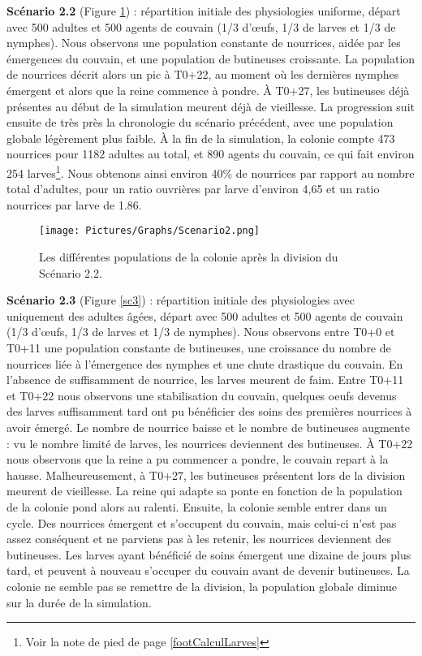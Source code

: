 		\textbf{Scénario 2.2} (Figure \ref{sc2}) : répartition initiale des physiologies uniforme, départ avec 500 adultes et 500 agents de couvain (1/3 d'œufs, 1/3 de larves et 1/3 de nymphes). Nous observons une population constante de nourrices, aidée par les émergences du couvain, et une population de butineuses croissante. La population de nourrices décrit alors un pic à T0+22, au moment où les dernières nymphes émergent et alors que la reine commence à pondre. À T0+27, les butineuses déjà présentes au début de la simulation meurent déjà de vieillesse. La progression suit ensuite de très près la chronologie du scénario précédent, avec une population globale légèrement plus faible. À la fin de la simulation, la colonie compte 473 nourrices pour 1182 adultes au total, et 890 agents du couvain, ce qui fait environ 254 larves\footnote{Voir la note de pied de page \ref{footCalculLarves}}. Nous obtenons ainsi environ 40\% de nourrices par rapport au nombre total d'adultes, pour un ratio ouvrières par larve d'environ 4,65 et un ratio nourrices par larve de 1.86.
	
	\begin{figure}
	\centering
	\texttt{[image: Pictures/Graphs/Scenario2.png]}
	\caption{Les différentes populations de la colonie après la division du Scénario 2.2.}
	\label{sc2}
	\end{figure}
		
		\textbf{Scénario 2.3} (Figure \ref{sc3}) : répartition initiale des physiologies avec uniquement des adultes âgées, départ avec 500 adultes et 500 agents de couvain (1/3 d'œufs, 1/3 de larves et 1/3 de nymphes). Nous observons entre T0+0 et T0+11 une population constante de butineuses, une croissance du nombre de nourrices liée à l'émergence des nymphes et une chute drastique du couvain. En l'absence de suffisamment de nourrice, les larves meurent de faim. Entre T0+11 et T0+22 nous observons une stabilisation du couvain, quelques oeufs devenus des larves suffisamment tard ont pu bénéficier des soins des premières nourrices à avoir émergé. Le nombre de nourrice baisse et le nombre de butineuses augmente : vu le nombre limité de larves, les nourrices deviennent des butineuses. À T0+22 nous observons que la reine a pu commencer a pondre, le couvain repart à la hausse. Malheureusement, à T0+27, les butineuses présentent lors de la division meurent de vieillesse. La reine qui adapte sa ponte en fonction de la population de la colonie pond alors au ralenti. Ensuite, la colonie semble entrer dans un cycle. Des nourrices émergent et s'occupent du couvain, mais celui-ci n'est pas assez conséquent et ne parviens pas à les retenir, les nourrices deviennent des butineuses. Les larves ayant bénéficié de soins émergent une dizaine de jours plus tard, et peuvent à nouveau s'occuper du couvain avant de devenir butineuses. La colonie ne semble pas se remettre de la division, la population globale diminue sur la durée de la simulation.
	
